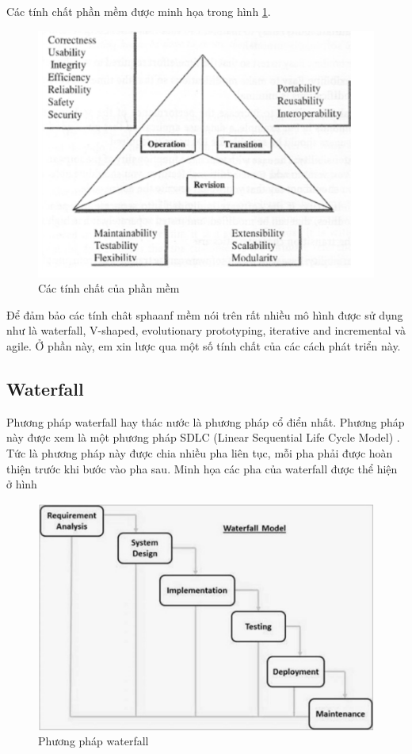 \documentclass{article}
\begin{document}
	Các tính chất phần mềm được minh họa trong hình \ref{fig:characteristics}.
	
	\begin{figure}[h][h]
		\centering
		\includegraphics[scale=0.3]{figures/characteristics.png}
		\caption{Các tính chất của phần mềm}
		\label{fig:characteristics}
	\end{figure}
	
	Để đảm bảo các tính chât sphaanf mềm nói trên rất nhiều mô hình được sử dụng như là waterfall, V-shaped, evolutionary prototyping, iterative and incremental và agile. Ở phần này, em xin lược qua một số tính chất của các cách phát triển này.
	
	\subsection{Waterfall}
	
	Phương pháp waterfall hay thác nước là phương pháp cổ điển nhất. Phương pháp này được xem là một phương pháp SDLC (Linear Sequential Life Cycle Model) \cite{tutorialspoint}. Tức là phương pháp này được chia nhiều pha liên tục, mỗi pha phải được hoàn thiện trước khi bước vào pha sau. Minh họa các pha của waterfall được thể hiện ở hình 
	
	\begin{figure}[h]
		\centering
		\includegraphics[scale=0.3]{figures/waterfall.png}
		\caption{Phương pháp waterfall \cite{tutorialspoint}}
		\label{fig:waterfall}
	\end{figure}
	
\end{document}
